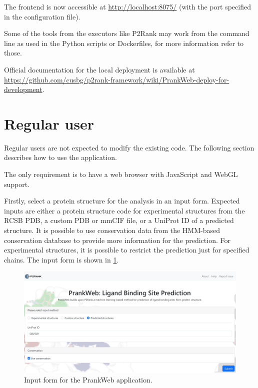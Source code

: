 The frontend is now accessible at \url{http://localhost:8075/} (with the port specified in the configuration file).

Some of the tools from the executors like P2Rank may work from the command line as used in the Python scripts or Dockerfiles, for more information refer to those.

Official documentation for the local deployment is available at \url{https://github.com/cusbg/p2rank-framework/wiki/PrankWeb-deploy-for-development}.


\section{Regular user}
\label{sec:regular_user}

Regular users are not expected to modify the existing code. The following section describes how to use the application.

The only requirement is to have a web browser with JavaScript and WebGL support.

Firstly, select a protein structure for the analysis in an input form. Expected inputs are either a protein structure code for experimental structures from the RCSB PDB, a custom PDB or mmCIF file, or a UniProt ID of a predicted structure. It is possible to use conservation data from the HMM-based conservation database to provide more information for the prediction. For experimental structures, it is possible to restrict the prediction just for specified chains. The input form is shown in \cref{fig:input_form}.

\begin{figure}[ht]
    \centering
    \includegraphics[width=\textwidth]{img/pw_introsite.png}
    \caption{Input form for the PrankWeb application.}
    \label{fig:input_form}
\end{figure}

